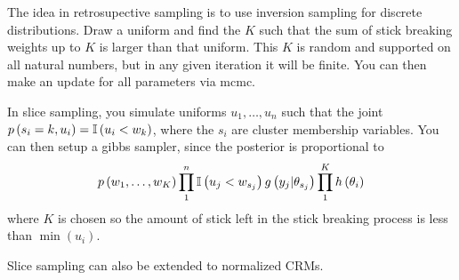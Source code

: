 \documentclass{article}
\begin{document}
The idea in retrosupective sampling is to use inversion sampling for discrete
distributions. Draw a uniform and find the $K$ such that the sum of stick
breaking weights up to $K$ is larger than that uniform. This $K$ is random and
supported on all natural numbers, but in any given iteration it will be finite.
You can then make an update for all parameters via mcmc.

In slice sampling, you simulate uniforms $u_{1}, \dots, u_{n}$ such that the
joint $p\left(s_{i} = k, u_{i}\right) = \mathbb{I}\left({u_{i} < w_{k}}\right)$, where the
$s_{i}$ are cluster membership variables. You can then setup a gibbs sampler,
since the posterior is proportional to
\begin{align}
p\left(w_{1}, \dots, w_{K}\right)\prod_{1}^{n} \mathbb{I}\left({u_{j} < w_{s_{j}}}\right) g\left(y_{j} \vert \theta_{s_{j}}\right) \prod_{1}^{K} h\left(\theta_{i}\right)
\end{align}
where $K$ is chosen so the amount of stick left in the stick breaking process is
less than $\min\left(u_{i}\right)$.

Slice sampling can also be extended to normalized CRMs.
\end{document}
